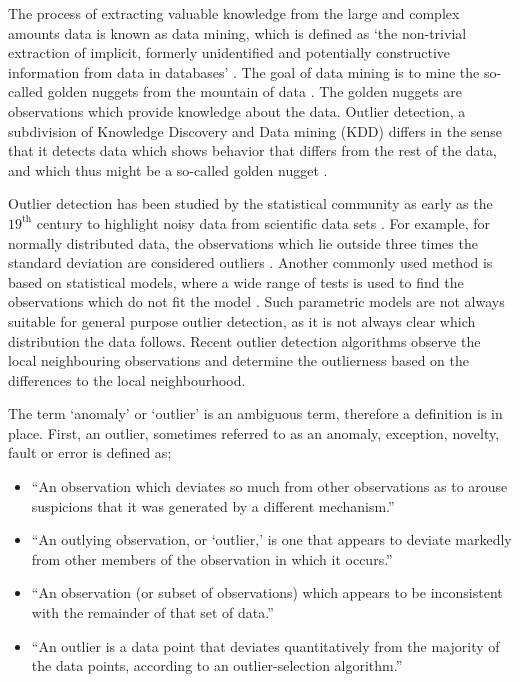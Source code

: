 The process of extracting valuable knowledge from the large and complex amounts data is known as data mining, which is defined as `the non-trivial extraction of implicit, formerly unidentified and potentially constructive information from data in databases' \cite{Zaiane99introductionto,Kantardzic:2002:DMC:581837}. The goal of data mining is to mine the so-called golden nuggets from the mountain of data \cite{1347303}. The golden nuggets are observations which provide knowledge about the data. Outlier detection, a subdivision of Knowledge Discovery and Data mining (KDD) differs in the sense that it detects data which shows behavior that differs from the rest of the data, and which thus might be a so-called golden nugget \cite{Chandola:2009:ADS:1541880.1541882}.

Outlier detection has been studied by the statistical community as early as the $19^{\text{th}}$ century to highlight noisy data from scientific data sets \cite{14786448708628471}. For example, for normally distributed data, the observations which lie outside three times the standard deviation are considered outliers \cite{9783540262565}. Another commonly used method is based on statistical models, where a wide range of tests is used to find the observations which do not fit the model \cite{barnett1994outliers}. Such parametric models are not always suitable for general purpose outlier detection, as it is not always clear which distribution the data follows. Recent outlier detection algorithms observe the local neighbouring observations and determine the outlierness based on the differences to the local neighbourhood.

The term `anomaly' or `outlier' is an ambiguous term, therefore a definition is in place. First, an outlier, sometimes referred to as an anomaly, exception, novelty, fault or error is defined as;
\begin{itemize}
  \item ``An observation which deviates so much from other observations as to arouse suspicions that it was generated by a different mechanism.'' \cite{Enderlein1987}
  \item ``An outlying observation, or ‘outlier,’ is one that appears to deviate markedly from other members of the observation in which it occurs.'' \cite{Grubbs1969}
  \item ``An observation (or subset of observations) which appears to be inconsistent with the remainder of that set of data.'' \cite{barnett1994outliers}
  \item ``An outlier is a data point that deviates quantitatively from the majority of the data points, according to an outlier-selection algorithm.'' \cite{outlierselection}
\end{itemize}

